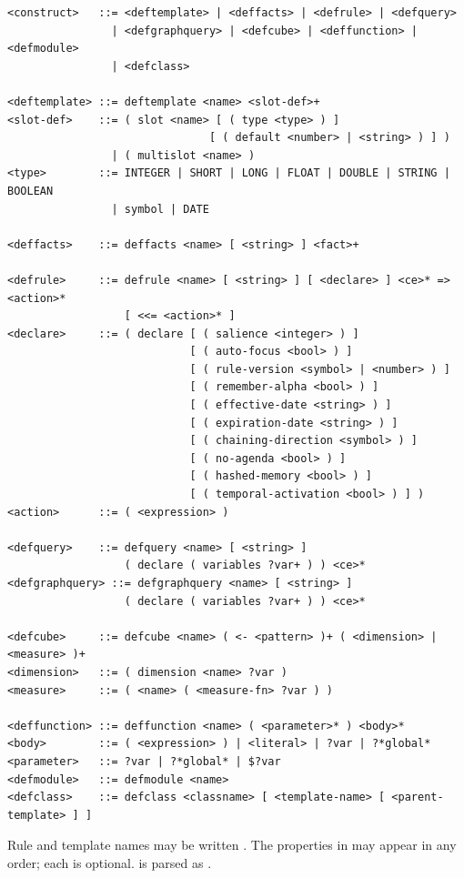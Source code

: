 \begin{lstlisting}[style=shell]
<construct>   ::= <deftemplate> | <deffacts> | <defrule> | <defquery>
                | <defgraphquery> | <defcube> | <deffunction> | <defmodule>
                | <defclass>

<deftemplate> ::= deftemplate <name> <slot-def>+
<slot-def>    ::= ( slot <name> [ ( type <type> ) ]
                               [ ( default <number> | <string> ) ] )
                | ( multislot <name> )
<type>        ::= INTEGER | SHORT | LONG | FLOAT | DOUBLE | STRING | BOOLEAN
                | symbol | DATE

<deffacts>    ::= deffacts <name> [ <string> ] <fact>+

<defrule>     ::= defrule <name> [ <string> ] [ <declare> ] <ce>* => <action>*
                  [ <<= <action>* ]
<declare>     ::= ( declare [ ( salience <integer> ) ]
                            [ ( auto-focus <bool> ) ]
                            [ ( rule-version <symbol> | <number> ) ]
                            [ ( remember-alpha <bool> ) ]
                            [ ( effective-date <string> ) ]
                            [ ( expiration-date <string> ) ]
                            [ ( chaining-direction <symbol> ) ]
                            [ ( no-agenda <bool> ) ]
                            [ ( hashed-memory <bool> ) ]
                            [ ( temporal-activation <bool> ) ] )
<action>      ::= ( <expression> )

<defquery>    ::= defquery <name> [ <string> ]
                  ( declare ( variables ?var+ ) ) <ce>*
<defgraphquery> ::= defgraphquery <name> [ <string> ]
                  ( declare ( variables ?var+ ) ) <ce>*

<defcube>     ::= defcube <name> ( <- <pattern> )+ ( <dimension> | <measure> )+
<dimension>   ::= ( dimension <name> ?var )
<measure>     ::= ( <name> ( <measure-fn> ?var ) )

<deffunction> ::= deffunction <name> ( <parameter>* ) <body>*
<body>        ::= ( <expression> ) | <literal> | ?var | ?*global*
<parameter>   ::= ?var | ?*global* | $?var
<defmodule>   ::= defmodule <name>
<defclass>    ::= defclass <classname> [ <template-name> [ <parent-template> ] ]
\end{lstlisting}

Rule and template names may be written . The properties
in  may appear in any order; each is optional.
 is parsed as .

